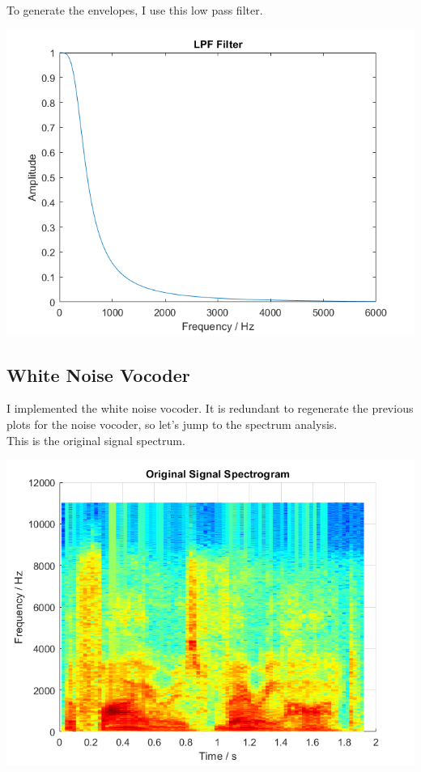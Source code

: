 \documentclass[11pt]{article}
\begin{document}
To generate the envelopes, I use this low pass filter.

\includegraphics[width=\textwidth]{output/envelope_lpf.png}

\pagebreak
\subsection{White Noise Vocoder}

I implemented the white noise vocoder.
It is redundant to regenerate the previous plots for
the noise vocoder, so let's jump to the spectrum analysis.\\

This is the original signal spectrum.

\includegraphics[height=0.4\textheight]{output/original_spectrogram.png}
\end{document}
